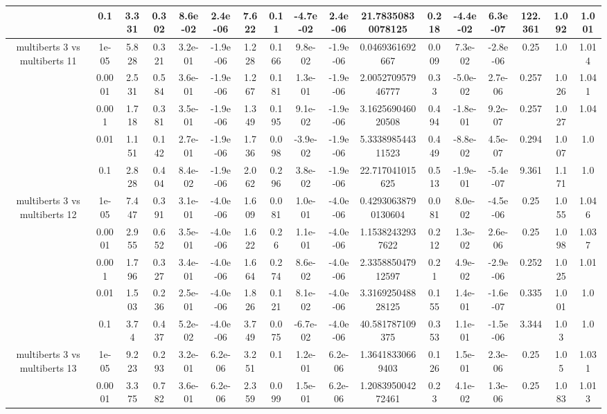 \begin{tabular}{|c|c|c|c|c|c|c|c|c|c|c|c|c|c|c|c|c|}
 & 0.1 & 3.331 & 0.302 & 8.6e-02 & 2.4e-06 & 7.622 & 0.11 & -4.7e-02 & 2.4e-06 & 21.78350830078125 & 0.218 & -4.4e-02 & 6.3e-07 & 122.361 & 1.092 & 1.001 \\
\hline
\multirow{5}{*}{multiberts 3 vs multiberts 11} & 1e-05 & 5.828 & 0.321 & 3.2e-01 & -1.9e-06 & 1.228 & 0.166 & 9.8e-02 & -1.9e-06 & 0.0469361692667 & 0.009 & 7.3e-02 & -2.8e-06 & 0.25 & 1.0 & 1.014 \\
 & 0.0001 & 2.531 & 0.584 & 3.6e-01 & -1.9e-06 & 1.267 & 0.181 & 1.3e-01 & -1.9e-06 & 2.005270957946777 & 0.33 & -5.0e-02 & 2.7e-06 & 0.257 & 1.026 & 1.041 \\
 & 0.001 & 1.718 & 0.381 & 3.5e-01 & -1.9e-06 & 1.349 & 0.195 & 9.1e-02 & -1.9e-06 & 3.162569046020508 & 0.494 & -1.8e-01 & 9.2e-07 & 0.257 & 1.027 & 1.04 \\
 & 0.01 & 1.151 & 0.142 & 2.7e-01 & -1.9e-06 & 1.736 & 0.098 & -3.9e-02 & -1.9e-06 & 5.333898544311523 & 0.449 & -8.8e-02 & 4.5e-07 & 0.294 & 1.007 & 1.0 \\
 & 0.1 & 2.828 & 0.404 & 8.4e-02 & -1.9e-06 & 2.062 & 0.296 & 3.8e-02 & -1.9e-06 & 22.717041015625 & 0.513 & -1.9e-01 & -5.4e-07 & 9.361 & 1.171 & 1.0 \\
\hline
\multirow{5}{*}{multiberts 3 vs multiberts 12} & 1e-05 & 7.447 & 0.391 & 3.1e-01 & -4.0e-06 & 1.609 & 0.081 & 1.0e-01 & -4.0e-06 & 0.42930638790130604 & 0.081 & 8.0e-02 & -4.5e-06 & 0.25 & 1.055 & 1.046 \\
 & 0.0001 & 2.955 & 0.652 & 3.5e-01 & -4.0e-06 & 1.622 & 0.26 & 1.1e-01 & -4.0e-06 & 1.15382432937622 & 0.212 & 1.3e-02 & 2.6e-06 & 0.25 & 1.098 & 1.037 \\
 & 0.001 & 1.796 & 0.327 & 3.4e-01 & -4.0e-06 & 1.664 & 0.274 & 8.6e-02 & -4.0e-06 & 2.335885047912597 & 0.21 & 4.9e-02 & -2.9e-06 & 0.252 & 1.025 & 1.01 \\
 & 0.01 & 1.503 & 0.236 & 2.5e-01 & -4.0e-06 & 1.826 & 0.121 & 8.1e-02 & -4.0e-06 & 3.316925048828125 & 0.155 & 1.4e-01 & -1.6e-07 & 0.335 & 1.001 & 1.0 \\
 & 0.1 & 3.74 & 0.437 & 5.2e-02 & -4.0e-06 & 3.749 & 0.075 & -6.7e-02 & -4.0e-06 & 40.581787109375 & 0.353 & 1.1e-01 & -1.5e-06 & 3.344 & 1.03 & 1.0 \\
\hline
\multirow{5}{*}{multiberts 3 vs multiberts 13} & 1e-05 & 9.223 & 0.293 & 3.2e-01 & 6.2e-06 & 3.251 & 0.1 & 1.2e-01 & 6.2e-06 & 1.36418330669403 & 0.126 & 1.5e-01 & 2.3e-06 & 0.25 & 1.05 & 1.031 \\
 & 0.0001 & 3.375 & 0.782 & 3.6e-01 & 6.2e-06 & 2.359 & 0.099 & 1.5e-01 & 6.2e-06 & 1.208395004272461 & 0.23 & 4.1e-02 & 1.3e-06 & 0.25 & 1.083 & 1.013 \\

\end{tabular}
